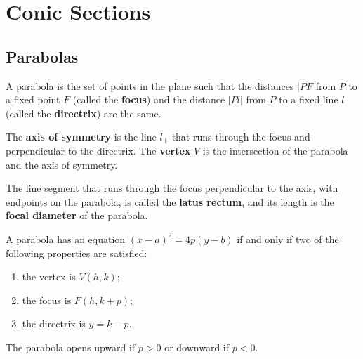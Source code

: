 
\chapter{Conic Sections}

\section{Parabolas}


\begin{definition}

A parabola is the set of points in the plane such that the distances $|PF$ from $P$ to a fixed point $F$ (called the \textbf{focus}) and the distance $|Pl|$ from $P$ to a fixed line $l$ (called the \textbf{directrix}) are the same.

The \textbf{axis of symmetry} is the line $l_\perp$ that runs through the focus and perpendicular to the directrix. The \textbf{vertex} $V$ is the intersection of the parabola and the axis of symmetry.


The line segment that runs through the focus perpendicular to the axis, with endpoints on the parabola, is called the \textbf{latus rectum}, and its length is the \textbf{focal diameter} of the parabola.

\end{definition}



  \begin{theorem}
  A parabola has an equation $(x-a)^2=4p(y-b)$ if and only if two of the following properties are satisfied:
  \begin{enumerate}
      \item the vertex is $V(h, k)$;
      \item the focus is $F(h, k+p)$;
      \item the directrix is $y=k-p$.
  \end{enumerate}
  
  The parabola opens upward if $p>0$ or downward if $p<0$.
  \end{theorem}
  
